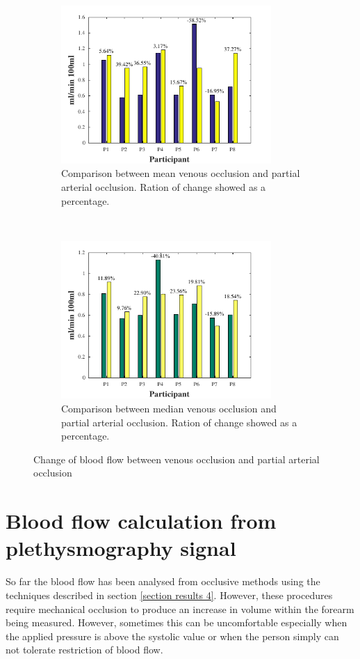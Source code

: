 \begin{figure}[!htbp]
	\centering
	\begin{subfigure}[t]{0.5\textwidth}
		\centering
		\includegraphics[height=6cm,keepaspectratio]{figure14a}    
		\caption{Comparison between mean venous occlusion and partial arterial occlusion. Ration of change showed as a percentage.}
		\label{fig:change_flow_mean}
	\end{subfigure}%
	~ 
	\begin{subfigure}[t]{0.5\textwidth}
		\centering
		\includegraphics[height=6cm,keepaspectratio,keepaspectratio]{figure14b}    
		\caption{Comparison between median venous occlusion and partial arterial occlusion. Ration of change showed as a percentage.}
		\label{fig:change_flow_median}
	\end{subfigure}
	\caption{Change of blood flow between venous occlusion and partial arterial occlusion}
	\label{fig:iPG_flow_comparative}
\end{figure}


\section{Blood flow calculation from plethysmography signal}
\label{section results 5}
So far the blood flow has been analysed from occlusive methods using the techniques described in section \ref{section results 4}. However, these procedures require mechanical occlusion to produce an increase in volume within the forearm being measured. However, sometimes this can be uncomfortable especially when the applied pressure is above the systolic value or when the person simply can not tolerate restriction of blood flow.

